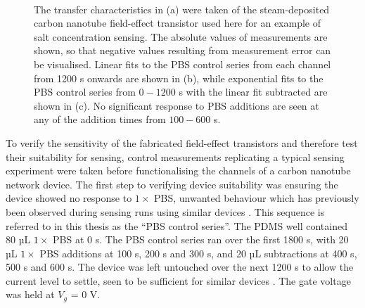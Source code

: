 \documentclass[
  a4paper,
]{scrbook}
\begin{document}
\begin{figure}
\begin{minipage}[t]{0.70\linewidth}
{{}

}

\end{minipage}%
%
\begin{minipage}[t]{0.15\linewidth}

{\centering 

~

}

\end{minipage}%

\caption{\label{fig-salt-conc-control-series}The transfer
characteristics in (a) were taken of the steam-deposited carbon nanotube
field-effect transistor used here for an example of salt concentration
sensing. The absolute values of measurements are shown, so that negative
values resulting from measurement error can be visualised. Linear fits
to the PBS control series from each channel from 1200 s onwards are
shown in (b), while exponential fits to the PBS control series from
\(0-1200\) s with the linear fit subtracted are shown in (c). No
significant response to PBS additions are seen at any of the addition
times from \(100-600\) s.}

\end{figure}

To verify the sensitivity of the fabricated field-effect transistors and
therefore test their suitability for sensing, control measurements
replicating a typical sensing experiment were taken before
functionalising the channels of a carbon nanotube network device. The
first step to verifying device suitability was ensuring the device
showed no response to \(1 \times\) PBS, unwanted behaviour which has
previously been observed during sensing runs using similar devices
\autocite{Cassie2023}. This sequence is referred to in this thesis as
the ``PBS control series''. The PDMS well contained 80 µL \(1 \times\)
PBS at 0 s. The PBS control series ran over the first 1800 s, with 20 µL
\(1 \times\) PBS additions at 100 s, 200 s and 300 s, and 20 µL
subtractions at 400 s, 500 s and 600 s. The device was left untouched
over the next 1200 s to allow the current level to settle, seen to be
sufficient for similar devices \autocite{Cassie2023}. The gate voltage
was held at \(V_g\) = 0 V.
\end{document}

